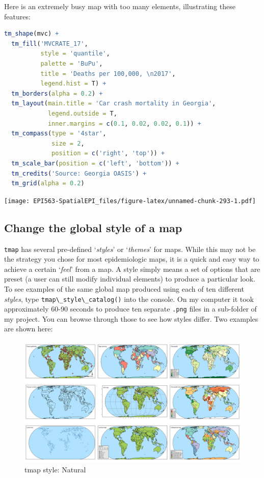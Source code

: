 \documentclass[
]{book}
\newcommand{\passthrough}[1]{#1}
\begin{document}
Here is an extremely busy map with too many elements, illustrating these features:

\begin{lstlisting}[language=R]
tm_shape(mvc) +
  tm_fill('MVCRATE_17',
          style = 'quantile',
          palette = 'BuPu',
          title = 'Deaths per 100,000, \n2017',
          legend.hist = T) +
  tm_borders(alpha = 0.2) +
  tm_layout(main.title = 'Car crash mortality in Georgia',
            legend.outside = T, 
            inner.margins = c(0.1, 0.02, 0.02, 0.1)) +
  tm_compass(type = '4star', 
             size = 2,
             position = c('right', 'top')) +
  tm_scale_bar(position = c('left', 'bottom')) +
  tm_credits('Source: Georgia OASIS') +
  tm_grid(alpha = 0.2)
\end{lstlisting}

\texttt{[image: EPI563-SpatialEPI\_files/figure-latex/unnamed-chunk-293-1.pdf]}

\hypertarget{change-the-global-style-of-a-map}{%
\subsection{Change the global style of a map}\label{change-the-global-style-of-a-map}}

\passthrough{\lstinline!tmap!} has several pre-defined `\emph{styles}' or `\emph{themes}' for maps. While this may not be the strategy you chose for most epidemiologic maps, it is a quick and easy way to achieve a certain `\emph{feel}' from a map. A style simply means a set of options that are preset (a user can still modify individual elements) to produce a particular look. To see examples of the same global map produced using each of ten different \emph{styles}, type \passthrough{\lstinline!tmap\_style\_catalog()!} into the console. On my computer it took approximately 60-90 seconds to produce ten separate \passthrough{\lstinline!.png!} files in a sub-folder of my project. You can browse through those to see how styles differ. Two examples are shown here:

\begin{figure}
\includegraphics[width=0.5\linewidth]{images/natural} \caption{tmap style: Natural}\label{fig:unnamed-chunk-294}
\end{figure}
\end{document}
